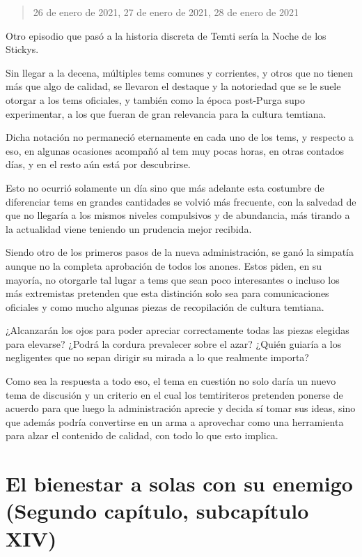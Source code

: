 \documentclass[
  spanish,
]{book}
\begin{document}
\begin{quote}
26 de enero de 2021, 27 de enero de 2021, 28 de enero de 2021
\end{quote}

Otro episodio que pasó a la historia discreta de Temti sería la Noche de los Stickys.

Sin llegar a la decena, múltiples tems comunes y corrientes, y otros que no tienen más que algo de calidad, se llevaron el destaque y la notoriedad que se le suele otorgar a los tems oficiales, y también como la época post-Purga supo experimentar, a los que fueran de gran relevancia para la cultura temtiana.

Dicha notación no permaneció eternamente en cada uno de los tems, y respecto a eso, en algunas ocasiones acompañó al tem muy pocas horas, en otras contados días, y en el resto aún está por descubrirse.

Esto no ocurrió solamente un día sino que más adelante esta costumbre de diferenciar tems en grandes cantidades se volvió más frecuente, con la salvedad de que no llegaría a los mismos niveles compulsivos y de abundancia, más tirando a la actualidad viene teniendo un prudencia mejor recibida.

Siendo otro de los primeros pasos de la nueva administración, se ganó la simpatía aunque no la completa aprobación de todos los anones. Estos piden, en su mayoría, no otorgarle tal lugar a tems que sean poco interesantes o incluso los más extremistas pretenden que esta distinción solo sea para comunicaciones oficiales y como mucho algunas piezas de recopilación de cultura temtiana.

¿Alcanzarán los ojos para poder apreciar correctamente todas las piezas elegidas para elevarse? ¿Podrá la cordura prevalecer sobre el azar? ¿Quién guiaría a los negligentes que no sepan dirigir su mirada a lo que realmente importa?

Como sea la respuesta a todo eso, el tema en cuestión no solo daría un nuevo tema de discusión y un criterio en el cual los temtiriteros pretenden ponerse de acuerdo para que luego la administración aprecie y decida sí tomar sus ideas, sino que además podría convertirse en un arma a aprovechar como una herramienta para alzar el contenido de calidad, con todo lo que esto implica.

\hypertarget{el-bienestar-a-solas-con-su-enemigo-segundo-capuxedtulo-subcapuxedtulo-xiv}{%
\section{El bienestar a solas con su enemigo (Segundo capítulo, subcapítulo XIV)}\label{el-bienestar-a-solas-con-su-enemigo-segundo-capuxedtulo-subcapuxedtulo-xiv}}
\end{document}

